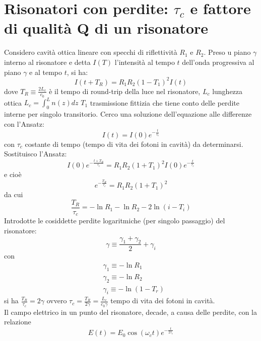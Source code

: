 \section{Risonatori con perdite: $\tau_c$ e fattore di qualità Q di un risonatore}
Considero cavità ottica lineare con specchi di riflettività $R_1$ e $R_2$. Preso u piano $\gamma$ interno al risonatore e detta $I(T)$ l'intensità al tempo $t$ dell'onda progressiva al piano $\gamma$ e al tempo $t$, si ha:
\begin{equation*}
I(t+T_R) = R_1R_2 (1-T_1)^2 I(t)
\end{equation*}
dove $T_R \equiv \frac{2L_c}{c_0}$ è il tempo di round-trip della luce nel risonatore, $L_c$ lunghezza ottica $L_c = \int_0^L n(z) dz$ $T_1$ trasmissione fittizia che tiene conto delle perdite interne per singolo transitorio.
Cerco una soluzione dell'equazione alle differenze con l'Ansatz:
\begin{equation*}
I(t) = I(0) e^{-\frac{t}{\tau_c}}
\end{equation*}
con $\tau_c$ costante di tempo (tempo di vita dei fotoni in cavità) da determinarsi. Sostituisco l'Ansatz:
\begin{equation*}
I(0) e^{-\frac{t+T_R}{\tau_c}} = R_1 R_2 (1 + T_1)^2 I(0)e^{-\frac{t}{\tau_c}}
\end{equation*}
e cioè
\begin{equation*}
e^{-\frac{T_R}{\tau_c}} = R_1 R_2 (1 + T_1)^2
\end{equation*}
da cui
\begin{equation*}
\frac{T_R}{\tau_c} = -\ln R_1 - \ln R_2 - 2 \ln(i-T_i)
\end{equation*}
Introdotte le cosiddette perdite logaritmiche (per singolo passaggio) del risonatore:
\begin{equation*}
\gamma \equiv \frac{\gamma_1 + \gamma_2}{2} + \gamma_i
\end{equation*}
con \begin{align*}
&\gamma_1 \equiv -\ln R_1\\
&\gamma_2 \equiv -\ln R_2\\
&\gamma_i \equiv -\ln (1-T_r)
\end{align*}
si ha $\frac{T_R}{\tau_c} = 2 \gamma$ ovvero $\tau_c = \frac{T_R}{2\gamma} = \frac{L_c}{c_0 \gamma}$ tempo di vita dei fotoni in cavità.
\\
Il campo elettrico in un punto del risonatore, decade, a causa delle perdite, con la relazione
\begin{equation*}
E(t) = E_0 \cos(\omega_c t) e^{-\frac{t}{2\tau_c}}
\end{equation*}

